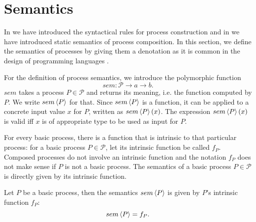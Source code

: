 \clearpage
\section{Semantics}
\label{chp:semantics}
In  we have introduced the syntactical rules for process construction and in  we have introduced static semantics of process composition. In this section, we define the semantics of processes by giving them a denotation as it is common in the design of programming languages \cite{DenSem}.

For the definition of process semantics, we introduce the polymorphic function 
\begin{equation*}
  sem \colon \mathcal{P} \to a \to b.
\end{equation*}
$sem$ takes a process $P \in \mathcal{P}$ and returns its meaning, i.e. the function computed by $P$. We write $sem \left\langle P \right\rangle$ for that. Since $sem \left\langle P \right\rangle$ is a function, it can be applied to a concrete input value $x$ for $P$, written as $sem \left\langle P \right\rangle \left( x \right)$. The expression $sem \left\langle P \right\rangle \left( x \right)$ is valid iff $x$ is of appropriate type to be used as input for $P$.

For every basic process, there is a function that is intrinsic to that particular process: for a basic process $P \in \mathcal{P}$, let its intrinsic function be called $f_P$. Composed processes do not involve an intrinsic function and the notation $f_P$ does not make sense if $P$ is not a basic process. The semantics of a basic process $P \in \mathcal{P}$ is directly given by its intrinsic function.
\begin{definition}
  \label{def:sem_atomic}
  Let $P$ be a basic process, then the semantics $sem \left\langle P \right\rangle$ is given by $P$'s intrinsic function $f_P$:
  \begin{equation*}
    \label{eqn:sem_atomic}
    sem \left\langle P \right\rangle = f_P.
  \end{equation*}
  \vspace*{-0.5em}
  \hfill\qedsymbol
\end{definition}

